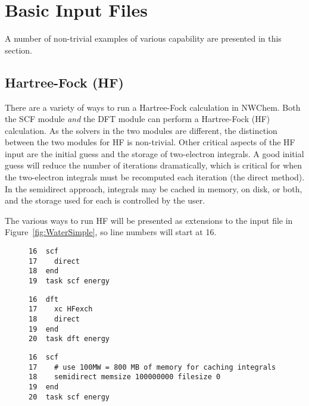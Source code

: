 \documentclass[letterpaper,12pt]{article}
\begin{document}
\newpage

\section{Basic Input Files}\label{sec:BasisInputFiles}

A number of non-trivial examples of various capability are presented in this section.

\newpage

\subsection{Hartree-Fock (HF)}\label{sec:HartreeFock}

There are a variety of ways to run a Hartree-Fock calculation in NWChem.  Both the SCF module \textit{and} the DFT module can perform a Hartree-Fock (HF) calculation.  As the solvers in the two modules are different, the distinction between the two modules for HF is non-trivial.  Other critical aspects of the HF input are the initial guess and the storage of two-electron integrals.  A good initial guess will reduce the number of iterations dramatically, which is critical for when the two-electron integrals must be recomputed each iteration (the direct method).  In the semidirect approach, integrals may be cached in memory, on disk, or both, and the storage used for each is controlled by the user.

The various ways to run HF will be presented as extensions to the input file in Figure~\ref{fig:WaterSimple}, so line numbers will start at 16.

\begin{figure}
    \label{fig:DirectSCF}
    \begin{verbatim}
16  scf
17    direct
18  end
19  task scf energy
    \end{verbatim}
\end{figure}

\begin{figure}
    \label{fig:DirectDFT}
    \begin{verbatim}
16  dft
17    xc HFexch
18    direct
19  end
20  task dft energy
    \end{verbatim}
\end{figure}

\begin{figure}
    \label{fig:SemidirectSCF1}
    \begin{verbatim}
16  scf
17    # use 100MW = 800 MB of memory for caching integrals
18    semidirect memsize 100000000 filesize 0 
19  end
20  task scf energy
    \end{verbatim}
\end{figure}
\end{document}
